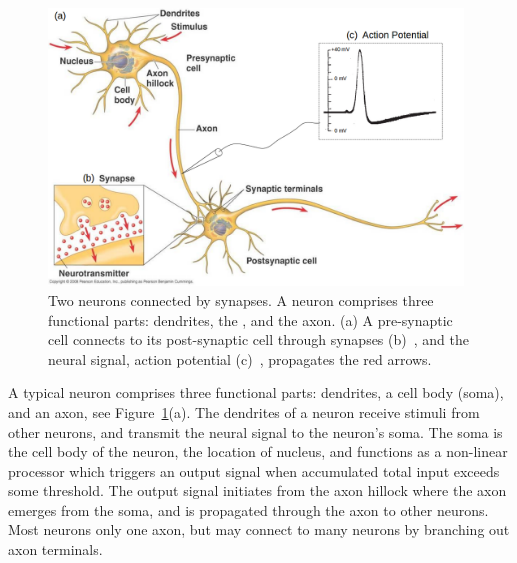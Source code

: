 	\begin{figure}[bt]
	\centering
	\includegraphics[width=0.98\textwidth]{pics_snn/neuron2.png}
	\caption{Two neurons connected by synapses. 
		A neuron comprises three functional parts: dendrites, the \DIFdelbeginFL {}\DIFdelendFL \DIFaddbeginFL {}\DIFaddendFL , and the axon. (a) A pre-synaptic cell connects to its post-synaptic cell through synapses \DIFdelbeginFL {}\DIFdelendFL (b)~\citep{reece2011campbell}, and the neural signal, \DIFaddbeginFL {}\DIFaddendFL action potential \DIFdelbeginFL {}\DIFdelendFL (c)~\citep{hodgkin1939action}, propagates \DIFdelbeginFL {}\DIFdelendFL \DIFaddbeginFL {}\DIFaddendFL the red arrows. }
	\label{Fig:neuron_basic}
\end{figure}

A typical neuron comprises \DIFdelbegin {}\DIFdelend three functional parts: dendrites, a cell body (soma), and an axon, see Figure~\ref{Fig:neuron_basic}(a).
The dendrites of a neuron receive stimuli from other neurons, and transmit the neural signal to the neuron's soma.
The soma is the cell body of the neuron, the location of \DIFaddbegin {}\DIFaddend nucleus, and functions as a non-linear processor which triggers an output signal when \DIFaddbegin {}\DIFaddend accumulated total input exceeds some threshold.
The output signal initiates from the axon hillock where the axon emerges from the soma, and is propagated through the axon to other neurons.
Most neurons \DIFdelbegin {}\DIFdelend \DIFaddbegin {}\DIFaddend only one axon, but may connect to many neurons by branching out axon terminals. 


